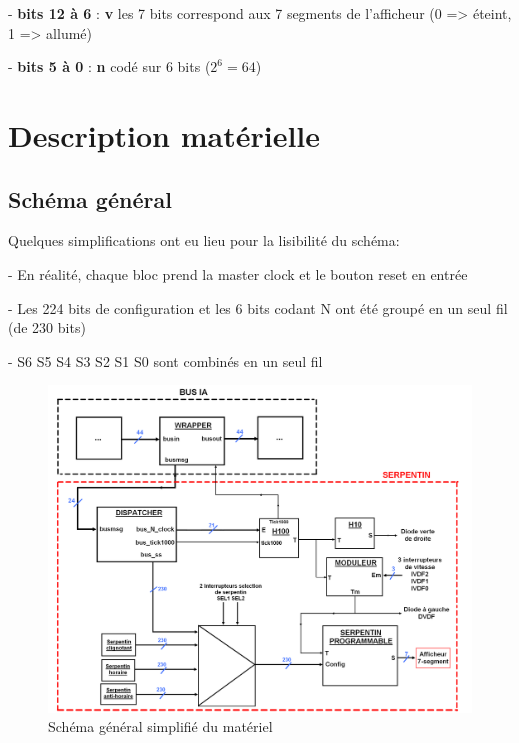 \documentclass[10pt]{article}
\begin{document}
        - \textbf{bits 12 à 6} : \textbf{v} les 7 bits correspond aux 7 segments de l'afficheur (0 => éteint, 1 => allumé)

        - \textbf{bits 5 à 0} : \textbf{n} codé sur 6 bits ($2^6 = 64$)

    \newpage
    \section{Description matérielle}
    
        \subsection{Schéma général}

         Quelques simplifications ont eu lieu pour la lisibilité du schéma:
        
        - En réalité, chaque bloc prend la master clock et le bouton reset en entrée
        
        - Les 224 bits de configuration et les 6 bits codant N ont été groupé en un seul fil (de 230 bits)
        
        - S6 S5 S4 S3 S2 S1 S0 sont combinés en un seul fil

        \begin{figure}[h!]
            \hspace*{-2cm}                                                          
            \includegraphics[width=20cm]{schema.png}
            \caption{Schéma général simplifié du matériel}
        \end{figure}
\end{document}
